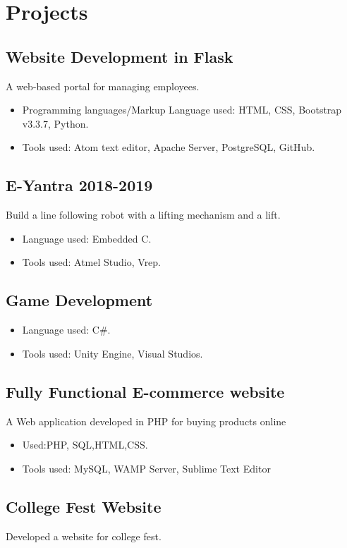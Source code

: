\documentclass{article}
\begin{document}
	\section{Projects}
		\subsection{Website Development in Flask}
			A web-based portal for managing employees. 
			\begin{itemize}
				\item Programming languages/Markup Language used: HTML, CSS, Bootstrap v3.3.7, Python.
				\item Tools used: Atom text editor, Apache Server, PostgreSQL, GitHub. 
			\end{itemize}
		\subsection{E-Yantra 2018-2019}
			Build a line following robot with a lifting mechanism and a lift.
			\begin{itemize}
				\item Language used: Embedded C. 
				\item Tools used: Atmel Studio, Vrep.
			\end{itemize}
		\subsection{Game Development}
			\begin{itemize}
				\item Language used: C\#. 
				\item Tools used: Unity Engine, Visual Studios. 
			\end{itemize}
		\subsection{Fully Functional E-commerce website}
			A Web application developed in PHP for buying products online
			\begin{itemize}
				\item  Used:PHP, SQL,HTML,CSS.
				\item Tools used: MySQL, WAMP Server, Sublime Text Editor 
			\end{itemize} 
		\subsection{College Fest Website}
			Developed a website for college fest.
\end{document}
